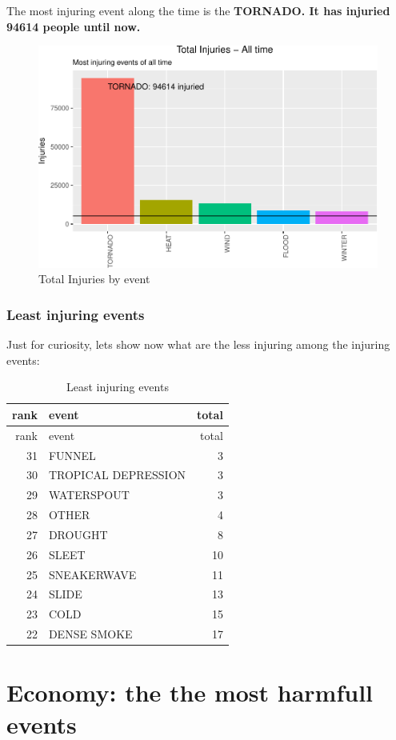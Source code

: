 \documentclass[]{article}
\begin{document}
The most injuring event along the time is the \textbf{TORNADO. It has
injuried 94614 people until now.}

\begin{figure}[htbp]
\centering
\includegraphics{readme_files/figure-latex/injuring-all-plot-1.pdf}
\caption{Total Injuries by event}
\end{figure}

\subsubsection{Least injuring events}\label{least-injuring-events}

Just for curiosity, lets show now what are the less injuring among the
injuring events:

\begin{longtable}[]{@{}rlr@{}}
\caption{Least injuring events}\tabularnewline
\toprule
rank & event & total\tabularnewline
\midrule
\endfirsthead
\toprule
rank & event & total\tabularnewline
\midrule
\endhead
31 & FUNNEL & 3\tabularnewline
30 & TROPICAL DEPRESSION & 3\tabularnewline
29 & WATERSPOUT & 3\tabularnewline
28 & OTHER & 4\tabularnewline
27 & DROUGHT & 8\tabularnewline
26 & SLEET & 10\tabularnewline
25 & SNEAKERWAVE & 11\tabularnewline
24 & SLIDE & 13\tabularnewline
23 & COLD & 15\tabularnewline
22 & DENSE SMOKE & 17\tabularnewline
\bottomrule
\end{longtable}

\section{Economy: the the most harmfull
events}\label{economy-the-the-most-harmfull-events}
\end{document}
